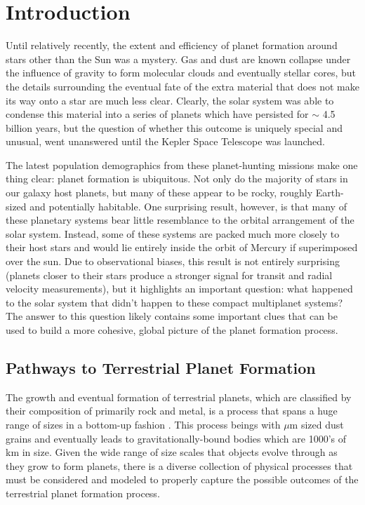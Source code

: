 \chapter {Introduction} \label{ch:intro}

Until relatively recently, the extent and efficiency of planet formation around stars other than the Sun was a mystery. Gas and dust are known collapse under the influence of gravity to form molecular clouds and eventually stellar cores, but the details surrounding the eventual fate of the extra material that does not make its way onto a star are much less clear. Clearly, the solar system was able to condense this material into a series of planets which have persisted for $\sim$ 4.5 billion years, but the question of whether this outcome is uniquely special and unusual, went unanswered until the Kepler Space Telescope was launched.

The latest population demographics from these planet-hunting missions make one thing clear: planet formation is ubiquitous. Not only do the majority of stars in our galaxy host planets, but many of these appear to be rocky, roughly Earth-sized and potentially habitable. One surprising result, however, is that many of these planetary systems bear little resemblance to the orbital arrangement of the solar system. Instead, some of these systems are packed much more closely to their host stars and would lie entirely inside the orbit of Mercury if superimposed over the sun. Due to observational biases, this result is not entirely surprising (planets closer to their stars produce a stronger signal for transit and radial velocity measurements), but it highlights an important question: what happened to the solar system that didn't happen to these compact multiplanet systems? The answer to this question likely contains some important clues that can be used to build a more cohesive, global picture of the planet formation process.

\section{Pathways to Terrestrial Planet Formation}

The growth and eventual formation of terrestrial planets, which are classified by their composition of primarily rock and metal, is a process that spans a huge range of sizes in a bottom-up fashion \cite{safronov72}. This process beings with $\mu$m sized dust grains and eventually leads to gravitationally-bound bodies which are 1000's of km in size. Given the wide range of size scales that objects evolve through as they grow to form planets, there is a diverse collection of physical processes that must be considered and modeled to properly capture the possible outcomes of the terrestrial planet formation process.


